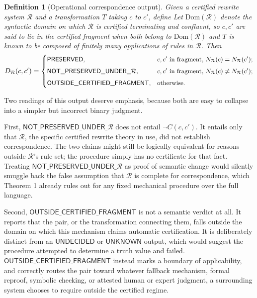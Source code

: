 \documentclass[11pt]{article}
\newtheorem{definition}{Definition}
\begin{document}
\begin{definition}[Operational correspondence output]
Given a certified rewrite system $\mathcal{R}$ and a transformation $T$ taking $c$ to $c'$, define
Let $\mathrm{Dom}(\mathcal{R})$ denote the syntactic domain on which $\mathcal{R}$ is certified terminating and confluent, so $c,c'$ are said to \emph{lie in the certified fragment} when both belong to $\mathrm{Dom}(\mathcal{R})$ and $T$ is known to be composed of finitely many applications of rules in $\mathcal{R}$. Then
\[
\begin{small}
D_{\mathcal{R}}(c,c') =
\begin{cases}
\textsf{PRESERVED}, & \text{$c,c'$ in fragment, } N_{\mathcal{R}}(c) = N_{\mathcal{R}}(c'); \\[4pt]
\textsf{NOT\_PRESERVED\_UNDER\_}\mathcal{R}, & \text{$c,c'$ in fragment, } N_{\mathcal{R}}(c) \neq N_{\mathcal{R}}(c'); \\[4pt]
\textsf{OUTSIDE\_CERTIFIED\_FRAGMENT}, & \text{otherwise.}
\end{cases}
\end{small}
\]
\end{definition}

Two readings of this output deserve emphasis, because both are easy to collapse into a simpler but incorrect binary judgment.

First, $\textsf{NOT\_PRESERVED\_UNDER\_}\mathcal{R}$ does not entail $\neg C(c,c')$. It entails only that $\mathcal{R}$, the specific certified rewrite theory in use, did not establish correspondence. The two claims might still be logically equivalent for reasons outside $\mathcal{R}$'s rule set; the procedure simply has no certificate for that fact. Treating $\textsf{NOT\_PRESERVED\_UNDER\_}\mathcal{R}$ as proof of semantic change would silently smuggle back the false assumption that $\mathcal{R}$ is complete for correspondence, which Theorem 1 already rules out for any fixed mechanical procedure over the full language.

Second, $\textsf{OUTSIDE\_CERTIFIED\_FRAGMENT}$ is not a semantic verdict at all. It reports that the pair, or the transformation connecting them, falls outside the domain on which this mechanism claims automatic certification. It is deliberately distinct from an $\textsf{UNDECIDED}$ or $\textsf{UNKNOWN}$ output, which would suggest the procedure attempted to determine a truth value and failed. $\textsf{OUTSIDE\_CERTIFIED\_FRAGMENT}$ instead marks a boundary of applicability, and correctly routes the pair toward whatever fallback mechanism, formal reproof, symbolic checking, or attested human or expert judgment, a surrounding system chooses to require outside the certified regime.
\end{document}
